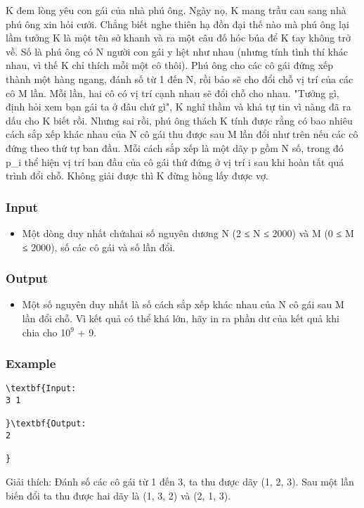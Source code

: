 

K đem lòng yêu con gái của nhà phú ông. Ngày nọ, K mang trầu cau sang nhà phú ông xin hỏi cưới. Chẳng biết nghe thiên hạ đồn đại thế nào mà phú ông lại lầm tưởng K là một tên sở khanh và ra một câu đố hóc búa để K tay không trở về. Số là phú ông có N người con gái y hệt như nhau (nhưng tính tình thí khác nhau, vì thế K chỉ thích mỗi một cô thôi). Phú ông cho các cô gái đứng xếp thành một hàng ngang, đánh số từ 1 đến N, rồi bảo sẽ cho đổi chỗ vị trí của các cô M lần. Mỗi lần, hai cô có vị trí cạnh nhau sẽ đổi chỗ cho nhau. "Tưởng gì, định hỏi xem bạn gái ta ở đâu chứ gì", K nghĩ thầm và khá tự tin vì nàng đã ra dấu cho K biết rồi. Nhưng sai rồi, phú ông thách K tính được rằng có bao nhiêu cách sắp xếp khác nhau của N cô gái thu được sau M lần đổi như trên nếu các cô đứng theo thứ tự ban đầu. Mỗi cách sắp xếp là một dãy p gồm N số, trong đó p\_i thể hiện vị trí ban đầu của cô gái thứ đứng ở vị trí i sau khi hoàn tất quá trình đổi chỗ. Không giải được thì K đừng hòng lấy được vợ.

\subsubsection{Input}
\begin{itemize}
	\item Một dòng duy nhất chứahai số nguyên dương N (2 ≤ N ≤ 2000) và M (0 ≤ M ≤ 2000), số các cô gái và số lần đổi.
\end{itemize}

\subsubsection{Output}
\begin{itemize}
	\item Một số nguyên duy nhất là số cách sắp xếp khác nhau của N cô gái sau M lần đổi chỗ. Vì kết quả có thể khá lớn, hãy in ra phần dư của kết quả khi chia cho 10$^9$ + 9. 
\end{itemize}

\subsubsection{Example}
\begin{verbatim}
\textbf{Input:
3 1

}\textbf{Output:
2

}\end{verbatim}

Giải thích: Đánh số các cô gái từ 1 đến 3, ta thu được dãy (1, 2, 3). Sau một lần biến đổi ta thu được hai dãy là (1, 3, 2) và (2, 1, 3).\textbf{
}
